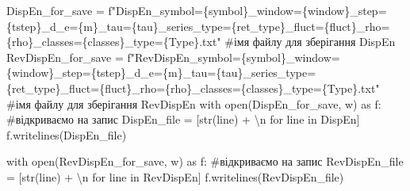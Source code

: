 \documentclass[
  letterpaper,
]{report}
\newenvironment{Shaded}{\begin{snugshade}}{\end{snugshade}}
\newcommand{\BuiltInTok}[1]{\textcolor[rgb]{0.00,0.23,0.31}{#1}}
\newcommand{\CharTok}[1]{\textcolor[rgb]{0.13,0.47,0.30}{#1}}
\newcommand{\CommentTok}[1]{\textcolor[rgb]{0.37,0.37,0.37}{#1}}
\newcommand{\ControlFlowTok}[1]{\textcolor[rgb]{0.00,0.23,0.31}{#1}}
\newcommand{\ImportTok}[1]{\textcolor[rgb]{0.00,0.46,0.62}{#1}}
\newcommand{\KeywordTok}[1]{\textcolor[rgb]{0.00,0.23,0.31}{#1}}
\newcommand{\NormalTok}[1]{\textcolor[rgb]{0.00,0.23,0.31}{#1}}
\newcommand{\OperatorTok}[1]{\textcolor[rgb]{0.37,0.37,0.37}{#1}}
\newcommand{\SpecialCharTok}[1]{\textcolor[rgb]{0.37,0.37,0.37}{#1}}
\newcommand{\SpecialStringTok}[1]{\textcolor[rgb]{0.13,0.47,0.30}{#1}}
\newcommand{\StringTok}[1]{\textcolor[rgb]{0.13,0.47,0.30}{#1}}
\begin{document}
\begin{Shaded}
\begin{Highlighting}[]
\NormalTok{DispEn\_for\_save }\OperatorTok{=} \SpecialStringTok{f"DispEn\_symbol=}\SpecialCharTok{\{}\NormalTok{symbol}\SpecialCharTok{\}}\SpecialStringTok{\_window=}\SpecialCharTok{\{}\NormalTok{window}\SpecialCharTok{\}}\SpecialStringTok{\_step=}\SpecialCharTok{\{}\NormalTok{tstep}\SpecialCharTok{\}}\SpecialStringTok{\_d\_e=}\SpecialCharTok{\{}\NormalTok{m}\SpecialCharTok{\}}\SpecialStringTok{\_tau=}\SpecialCharTok{\{}\NormalTok{tau}\SpecialCharTok{\}}\SpecialStringTok{\_series\_type=}\SpecialCharTok{\{}\NormalTok{ret\_type}\SpecialCharTok{\}}\SpecialStringTok{\_fluct=}\SpecialCharTok{\{}\NormalTok{fluct}\SpecialCharTok{\}}\SpecialStringTok{\_rho=}\SpecialCharTok{\{}\NormalTok{rho}\SpecialCharTok{\}}\SpecialStringTok{\_classes=}\SpecialCharTok{\{}\NormalTok{classes}\SpecialCharTok{\}}\SpecialStringTok{\_type=}\SpecialCharTok{\{}\NormalTok{Type}\SpecialCharTok{\}}\SpecialStringTok{.txt"} \CommentTok{\#ім\textquotesingle{}я файлу для зберігання DispEn}
\NormalTok{RevDispEn\_for\_save }\OperatorTok{=} \SpecialStringTok{f"RevDispEn\_symbol=}\SpecialCharTok{\{}\NormalTok{symbol}\SpecialCharTok{\}}\SpecialStringTok{\_window=}\SpecialCharTok{\{}\NormalTok{window}\SpecialCharTok{\}}\SpecialStringTok{\_step=}\SpecialCharTok{\{}\NormalTok{tstep}\SpecialCharTok{\}}\SpecialStringTok{\_d\_e=}\SpecialCharTok{\{}\NormalTok{m}\SpecialCharTok{\}}\SpecialStringTok{\_tau=}\SpecialCharTok{\{}\NormalTok{tau}\SpecialCharTok{\}}\SpecialStringTok{\_series\_type=}\SpecialCharTok{\{}\NormalTok{ret\_type}\SpecialCharTok{\}}\SpecialStringTok{\_fluct=}\SpecialCharTok{\{}\NormalTok{fluct}\SpecialCharTok{\}}\SpecialStringTok{\_rho=}\SpecialCharTok{\{}\NormalTok{rho}\SpecialCharTok{\}}\SpecialStringTok{\_classes=}\SpecialCharTok{\{}\NormalTok{classes}\SpecialCharTok{\}}\SpecialStringTok{\_type=}\SpecialCharTok{\{}\NormalTok{Type}\SpecialCharTok{\}}\SpecialStringTok{.txt"} \CommentTok{\#ім\textquotesingle{}я файлу для зберігання RevDispEn}
\ControlFlowTok{with} \BuiltInTok{open}\NormalTok{(DispEn\_for\_save, }\StringTok{\textquotesingle{}w\textquotesingle{}}\NormalTok{) }\ImportTok{as}\NormalTok{ f: }\CommentTok{\#відкриваємо на запис }
\NormalTok{    DispEn\_file }\OperatorTok{=}\NormalTok{ [}\BuiltInTok{str}\NormalTok{(line) }\OperatorTok{+} \StringTok{\textquotesingle{}}\CharTok{\textbackslash{}n}\StringTok{\textquotesingle{}} \ControlFlowTok{for}\NormalTok{ line }\KeywordTok{in}\NormalTok{ DispEn]}
\NormalTok{    f.writelines(DispEn\_file)}
    
\ControlFlowTok{with} \BuiltInTok{open}\NormalTok{(RevDispEn\_for\_save, }\StringTok{\textquotesingle{}w\textquotesingle{}}\NormalTok{) }\ImportTok{as}\NormalTok{ f: }\CommentTok{\#відкриваємо на запис }
\NormalTok{    RevDispEn\_file }\OperatorTok{=}\NormalTok{ [}\BuiltInTok{str}\NormalTok{(line) }\OperatorTok{+} \StringTok{\textquotesingle{}}\CharTok{\textbackslash{}n}\StringTok{\textquotesingle{}} \ControlFlowTok{for}\NormalTok{ line }\KeywordTok{in}\NormalTok{ RevDispEn]}
\NormalTok{    f.writelines(RevDispEn\_file)}
\end{Highlighting}
\end{Shaded}
\end{document}
